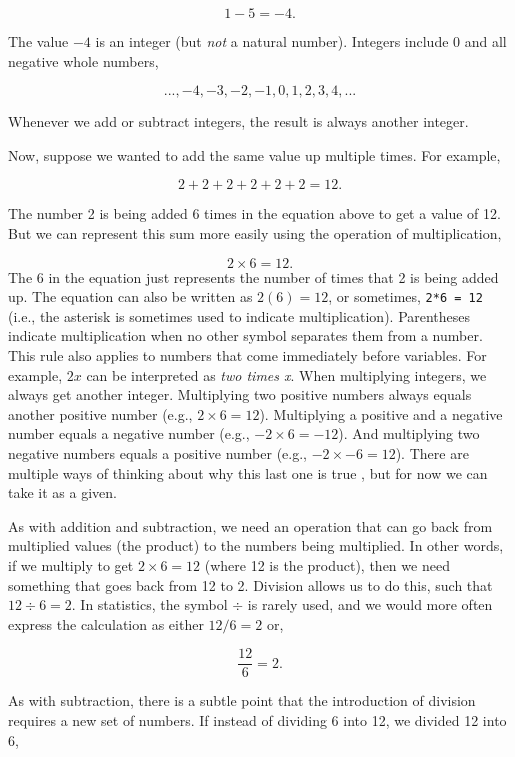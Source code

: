 \documentclass[
]{scrbook}
\begin{document}
\[1 - 5 = -4.\]

The value \(-4\) is an integer (but \emph{not} a natural number).
Integers include 0 and all negative whole numbers,

\[..., -4, -3, -2, -1, 0, 1, 2, 3, 4,  ...\]

Whenever we add or subtract integers, the result is always another integer.

Now, suppose we wanted to add the same value up multiple times.
For example,

\[2 + 2 + 2 + 2 + 2 + 2 = 12.\]

The number 2 is being added 6 times in the equation above to get a value of 12.
But we can represent this sum more easily using the operation of multiplication,

\[2 \times 6 = 12.\]
The 6 in the equation just represents the number of times that 2 is being added up.
The equation can also be written as \(2(6) = 12\), or sometimes, \texttt{2*6\ =\ 12} (i.e., the asterisk is sometimes used to indicate multiplication).
Parentheses indicate multiplication when no other symbol separates them from a number.
This rule also applies to numbers that come immediately before variables.
For example, \(2x\) can be interpreted as \emph{two times x}.
When multiplying integers, we always get another integer.
Multiplying two positive numbers always equals another positive number (e.g., \(2 \times 6 = 12\)).
Multiplying a positive and a negative number equals a negative number (e.g., \(-2 \times 6 = -12\)).
And multiplying two negative numbers equals a positive number (e.g., \(-2 \times -6 = 12\)).
There are multiple ways of thinking about why this last one is true \citep[see, e.g.,][ for one explanation]{Askey1999}, but for now we can take it as a given.

As with addition and subtraction, we need an operation that can go back from multiplied values (the product) to the numbers being multiplied.
In other words, if we multiply to get \(2 \times 6 = 12\) (where 12 is the product), then we need something that goes back from 12 to 2.
Division allows us to do this, such that \(12 \div 6 = 2\).
In statistics, the symbol \(\div\) is rarely used, and we would more often express the calculation as either \(12/6 = 2\) or,

\[\frac{12}{6} = 2.\]

As with subtraction, there is a subtle point that the introduction of division requires a new set of numbers.
If instead of dividing 6 into 12, we divided 12 into 6,
\end{document}

